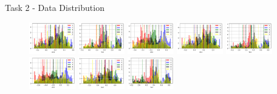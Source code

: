 \documentclass{beamer}
\begin{document}
\begin{frame}{Task 2 - Data Distribution}

  \begin{figure}[H]
    \centering
    \includegraphics[width=0.18\textwidth]{../code/Task2/Analysis/Hist-X01}
    \includegraphics[width=0.18\textwidth]{../code/Task2/Analysis/Hist-Y01}
    \includegraphics[width=0.18\textwidth]{../code/Task2/Analysis/Hist-Z01}
    \includegraphics[width=0.18\textwidth]{../code/Task2/Analysis/Hist-X11}
    \includegraphics[width=0.18\textwidth]{../code/Task2/Analysis/Hist-Y11} \\
    \includegraphics[width=0.18\textwidth]{../code/Task2/Analysis/Hist-Z11}
    \includegraphics[width=0.18\textwidth]{../code/Task2/Analysis/Hist-X21}
    \includegraphics[width=0.18\textwidth]{../code/Task2/Analysis/Hist-Y21}

\end{figure}
\end{frame}
\end{document}
